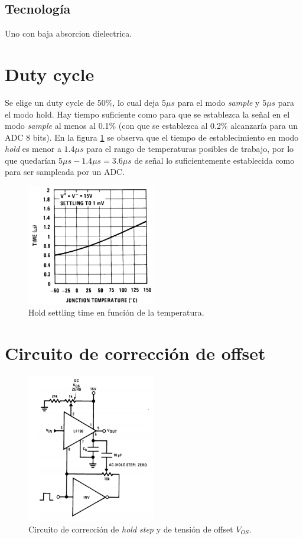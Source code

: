 \documentclass[../../ASSD_TP1_G7.tex]{subfiles}
\begin{document}
\subsection{Tecnolog\'ia}
Uno con baja absorcion dielectrica.


\section{Duty cycle}
Se elige un duty cycle de 50\%, lo cual deja $5 \mu s$ para el modo \textit{sample} y $5 \mu s$ para el modo hold. Hay tiempo suficiente como para que se establezca la se\~nal en el modo \textit{sample} al menos al 0.1\% (con que se establezca al 0.2\% alcanzar\'ia para un ADC 8 bits). En la figura \ref{fig:syh_hold_settling_time_datasheet} se observa que el tiempo de establecimiento en modo \textit{hold} es menor a $1.4\mu s$ para el rango de temperaturas posibles de trabajo, por lo que quedar\'ian $5\mu s - 1.4 \mu s = 3.6 \mu s$ de se\~nal lo suficientemente establecida como para ser sampleada por un ADC.

		\begin{figure}[H]
			\centering
			\includegraphics[width = 0.5\textwidth]{figures/hold_settling_time_datasheet.png}
			\caption{Hold settling time en funci\'on de la temperatura.}
			\label{fig:syh_hold_settling_time_datasheet}
		\end{figure}


\section{Circuito de correcci\'on de offset} \label{sec:syh_correccion_offset}

		\begin{figure}[H]
			\centering
			\includegraphics[width = 0.5\textwidth]{figures/offset_adjust_schematic.png}
			\caption{Circuito de correcci\'on de \textit{hold step} y de tensi\'on de offset $V_{OS}$.}
			\label{fig:syh_acquisition_time_datasheet}
		\end{figure}	
\end{document}

